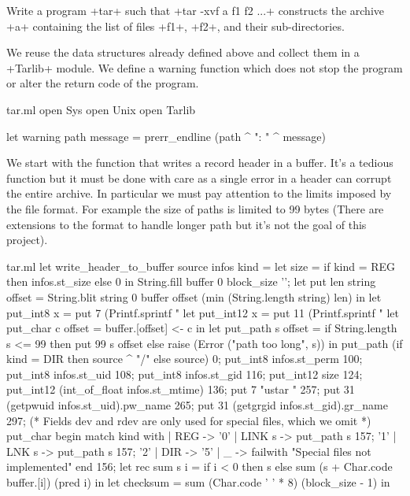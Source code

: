 \begin{exercise}
\label{ex/maketar}
Write a program  \ml+tar+ such that \ml+tar -xvf a f1 f2 ...+
constructs the archive \ml+a+ containing the list of files \ml+f1+,
\ml+f2+, \etc{} and their sub-directories. 
\end{exercise}
\begin{answer}
We reuse the data structures already defined above and collect them in
a \ml+Tarlib+ module. We define a warning function which does not stop
the program or alter the return code of the program.
%
\begin{listingcodefile}{tar.ml}
open Sys
open Unix
open Tarlib

let warning path message =  prerr_endline (path ^ ": " ^ message)
\end{listingcodefile}
%
We start with the function that writes a record header in a
buffer. It's a tedious function but it must be done with care as a
single error in a header can corrupt the entire archive. In particular
we must pay attention to the limits imposed by the file format. For
example the size of paths is limited to 99 bytes (There are extensions
to the format to handle longer path but it's not the goal of this
project). 
%
\begin{listingcodefile}{tar.ml}
let write_header_to_buffer source infos kind =
  let size = if kind = REG then infos.st_size else 0 in
  String.fill buffer 0 block_size '';
  let put len string offset = 
    String.blit string 0 buffer offset (min (String.length string) len) in
  let put_int8 x = put 7 (Printf.sprintf "%
  let put_int12 x = put 11 (Printf.sprintf "%
  let put_char c offset = buffer.[offset] <- c in
  let put_path s offset = 
    if String.length s <= 99 then put 99 s offset
    else raise (Error ("path too long", s)) in
  put_path (if kind = DIR then source ^ "/" else source) 0;
  put_int8 infos.st_perm 100;
  put_int8 infos.st_uid 108;
  put_int8 infos.st_gid 116;
  put_int12 size 124;
  put_int12 (int_of_float infos.st_mtime) 136;
  put 7 "ustar  " 257;
  put 31 (getpwuid infos.st_uid).pw_name 265;
  put 31 (getgrgid infos.st_gid).gr_name 297;
  (* Fields dev and rdev are only used for special files, which we omit *) 
  put_char
    begin match kind with
    | REG -> '0'
    | LINK s -> put_path s 157; '1' 
    | LNK s ->  put_path s 157; '2'
    | DIR -> '5'
    | _ -> failwith "Special files not implemented"
    end 156;
  let rec sum s i =
    if i < 0 then s else sum (s + Char.code buffer.[i]) (pred i) in
  let checksum = sum (Char.code ' ' * 8) (block_size - 1)  in

\end{listingcodefile}
\end{answer}

